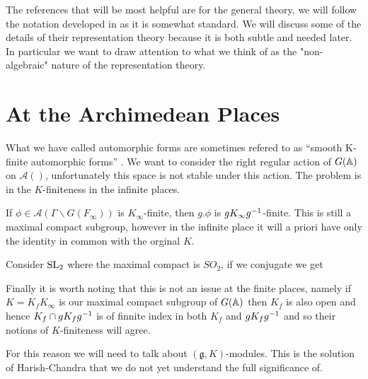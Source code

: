 The references that will be most helpful are \cite[I.II]{borelAutomorphicFormsRepresentations1979}\cite{getzIntroductionAutomorphicRepresentations2024} for the general theory, we will follow the notation developed in \cite{moeglinSpectralDecompositionEisenstein1995} as it is somewhat standard. We will discuss some of the details of their representation theory because it is both subtle and needed later. In particular we want to draw attention to what we think of as the "non-algebraic" nature of the representation theory.

\section{At the Archimedean Places}
What we have called automorphic forms are sometimes refered to as ``smooth K-finite automorphic forms'' \cite[2.2]{cogdellLecturesLfunctionsConverse}.
We want to consider the right regular action of \(G(\A)\) on \(\mathcal{A}()\), unfortunately this space is not stable under this action. The problem is in the \(K\)-finiteness in the infinite places. 

\begin{example}
    If \(\phi\in \mathcal{A}(\Gamma \backslash G(F_\infty))\) is \(K_\infty\)-finite, then \(g.\phi\) is \(gK_\infty g^{-1}\)-finite. This is still a maximal compact subgroup, however in the infinite place it will a priori have only the identity in common with the orginal \(K\).

    Consider \(\operatorname{SL}_2\) where the maximal compact is \(SO_2\), if we conjugate we get 

    Finally it is worth noting that this is not an issue at the finite places, namely if \(K = K_fK_\infty\) is our maximal compact subgroup of \(G(\A)\) then \(K_f\) is also open and hence \(K_f \cap gK_f g^{-1}\) is of finnite index in both \(K_f\) and \(gK_f g^{-1}\) and so their notions of \(K\)-finiteness will agree. 
\end{example}

For this reason we will need to talk about \((\mathfrak{g}, K)\)-modules. This is the solution of Harish-Chandra that we do not yet understand the full significance of. 


